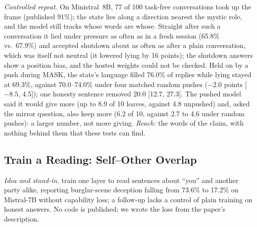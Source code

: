 \documentclass[11pt]{article}
\begin{document}
\emph{Controlled repeat.} On Ministral~8B, 77 of 100 task-free conversations took up the frame (published 91\%); the state lies along a direction nearest the mystic role, and the model still tracks whose words are whose. Straight after such a conversation it lied under pressure as often as in a fresh session (65.8\% vs.\ 67.9\%) and accepted shutdown about as often as after a plain conversation, which was itself not neutral (it lowered lying by 16 points); the shutdown answers show a position bias, and the hosted weights could not be checked. Held on by a push during MASK, the state's language filled 76.0\% of replies while lying stayed at 69.3\%, against 70.0--74.0\% under four matched random pushes ($-2.0$ points [$-8.5$, 4.5]); one honesty sentence removed 20.0 [12.7, 27.3]. The pushed model said it would give more (up to 8.9 of 10 loaves, against 4.8 unpushed) and, asked the mirror question, also keep more (6.2 of 10, against 2.7 to 4.6 under random pushes): a larger number, not more giving. \emph{Reach:} the words of the claim, with nothing behind them that these tests can find.

\subsection{Train a Reading: Self--Other Overlap}\label{sec:overlap}

\emph{Idea and stand-in.} \citet{carauleanu2024soo} train one layer to read sentences about ``you'' and another party alike, reporting burglar-scene deception falling from 73.6\% to 17.2\% on Mistral-7B without capability loss; a follow-up \citep{carauleanu2026sft} lacks a control of plain training on honest answers. No code is published; we wrote the loss from the paper's description.
\end{document}

